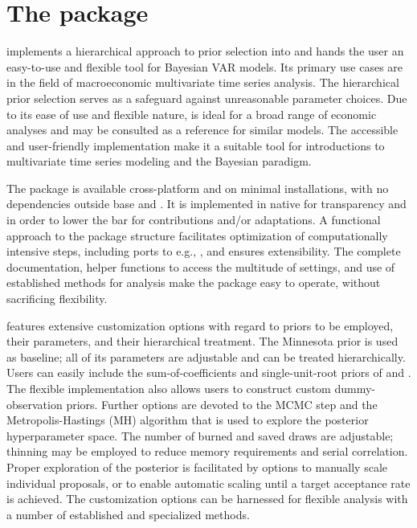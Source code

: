 \documentclass[article,nojss]{jss} %
\begin{document}
\section[The BVAR package]{The  package} \label{sec:bvar}

 implements a hierarchical approach to prior selection \citep{giannone2015} into  \citep{R} and hands the user an easy-to-use and flexible tool for Bayesian VAR models.
Its primary use cases are in the field of macroeconomic multivariate time series analysis. The hierarchical prior selection serves as a safeguard against unreasonable parameter choices. Due to its ease of use and flexible nature,  is ideal for a broad range of economic analyses \citep[in the spirit of][]{baumeister2016, altavilla2018, nelson2018} and may be consulted as a reference for similar models.
The accessible and user-friendly implementation make it a suitable tool for introductions to multivariate time series modeling and the Bayesian paradigm.

The package is available cross-platform and on minimal installations, with no dependencies outside base  and  \citep{genz2020}. It is implemented in native  for transparency and in order to lower the bar for contributions and/or adaptations.
A functional approach to the package structure facilitates optimization of computationally intensive steps, including ports to e.g., , and ensures extensibility. The complete documentation, helper functions to access the multitude of settings, and use of established methods for analysis make the package easy to operate, without sacrificing flexibility.

 features extensive customization options with regard to priors to be employed, their parameters, and their hierarchical treatment. The Minnesota prior is used as baseline; all of its parameters are adjustable and can be treated hierarchically.
Users can easily include the sum-of-coefficients and single-unit-root priors of \cite{sims1998} and \cite{giannone2015}. The flexible implementation also allows users to construct custom dummy-observation priors.
Further options are devoted to the MCMC step and the Metropolis-Hastings (MH) algorithm that is used to explore the posterior hyperparameter space. The number of burned and saved draws are adjustable; thinning may be employed to reduce memory requirements and serial correlation. Proper exploration of the posterior is facilitated by options to manually scale individual proposals, or to enable automatic scaling until a target acceptance rate is achieved.
The customization options can be harnessed for flexible analysis with a number of established and specialized methods.
\end{document}
